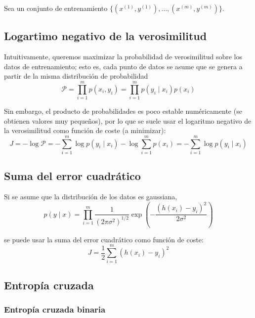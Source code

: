 Sea un conjunto de entrenamiento $\{(x^{(1)}, y^{(1)}), \ldots, (x^{(m)}, y^{(m)})\}$. 

\subsection{Logartimo negativo de la verosimilitud}

Intuitivamente, queremos maximizar la probabilidad de verosimilitud sobre los datos de entrenamiento; esto es, cada punto de datos se asume que se genera a partir de la misma distribución de probabilidad
\begin{equation}
\mathcal{P} = \prod_{i = 1}^m p(x_i, y_i) = \prod_{i = 1}^m p(y_i \mid x_i) p(x_i)
\end{equation}

Sin embargo, el producto de probabilidades es poco estable numéricamente (se obtienen valores muy pequeños), por lo que se suele usar el logaritmo negativo de la verosimilitud como función de coste (a minimizar):
\begin{equation}
J = -\log \mathcal{P} = -\sum_{i = 1}^m \log p(y_i \mid x_i) - \log \sum_{i = 1}^m p(x_i) = -\sum_{i = 1}^m \log p(y_i \mid x_i)
\end{equation}

\subsection{Suma del error cuadrático}

\noindent Si se asume que la distribución de los datos es gaussiana,
\begin{equation}
p(y \mid x) = \prod_{i = 1}^m \frac{1}{(2\pi \sigma^2)^{1/2}} \exp\left(-\frac{(h(x_i) - y_i)^2}{2\sigma^2}\right)
\end{equation} 

\noindent se puede usar la suma del error cuadrático como función de coste:
\begin{equation}
J = \frac{1}{2} \sum_{i = 1}^m (h(x_i) - y_i)^2
\end{equation}

\subsection{Entropía cruzada}

\subsubsection{Entropía cruzada binaria}

